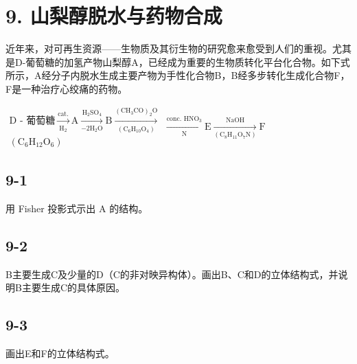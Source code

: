 \section*{9. 山梨醇脱水与药物合成}
近年来，对可再⽣资源——⽣物质及其衍⽣物的研究愈来愈受到⼈们的重视。尤其是D-葡萄糖的加氢产物⼭梨醇A，已经成为重要的⽣物质转化平台化合物。如下式所⽰，A经分⼦内脱⽔⽣成主要产物为⼿性化合物B，B经多步转化⽣成化合物F，F是⼀种治疗⼼绞痛的药物。

$
\begin{array}{c} \text {D - 葡萄糖} \xrightarrow [ \mathrm{H} _ {2} ]{\text {cat.}} \mathrm{A} \xrightarrow [ \mathrm{-2H} _ {2} \mathrm{O} ]{\mathrm{H} _ {2} \mathrm{SO} _ {4}} \mathrm{B} \xrightarrow [ (\mathrm{C} _ {6} \mathrm{H} _ {1 0} \mathrm{O} _ {4}) ]{(\mathrm{CH} _ {3} \mathrm{CO}) _ {2} \mathrm{O}} \\ (\mathrm{C} _ {6} \mathrm{H} _ {1 2} \mathrm{O} _ {6}) \end{array} \xrightarrow [ \text {N} ]{\text {conc. HNO} _ {3}} \mathrm{E} \xrightarrow [ (\mathrm{C} _ {8} \mathrm{H} _ {1 1} \mathrm{O} _ {7} \mathrm{N}) ]{\text {NaOH}} \mathrm{F}
$

\subsection*{9-1}
⽤ Fisher 投影式⽰出 A 的结构。

\subsection*{9-2}
B主要⽣成C及少量的D（C的⾮对映异构体）。画出B、C和D的⽴体结构式，并说明B主要⽣成C的具体原因。

\subsection*{9-3}
画出E和F的⽴体结构式。
